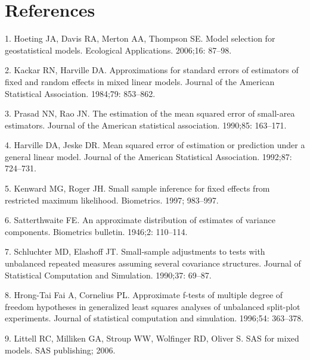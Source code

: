 \documentclass[10pt,letterpaper]{article}
\begin{document}
\hypertarget{references}{%
\section*{References}\label{references}}

\hypertarget{refs}{}
\leavevmode\hypertarget{ref-hoeting2006model}{}%
1. Hoeting JA, Davis RA, Merton AA, Thompson SE. Model selection for
geostatistical models. Ecological Applications. 2006;16: 87--98.

\leavevmode\hypertarget{ref-kackar1984approximations}{}%
2. Kackar RN, Harville DA. Approximations for standard errors of
estimators of fixed and random effects in mixed linear models. Journal
of the American Statistical Association. 1984;79: 853--862.

\leavevmode\hypertarget{ref-prasad1990estimation}{}%
3. Prasad NN, Rao JN. The estimation of the mean squared error of
small-area estimators. Journal of the American statistical association.
1990;85: 163--171.

\leavevmode\hypertarget{ref-harville1992mean}{}%
4. Harville DA, Jeske DR. Mean squared error of estimation or prediction
under a general linear model. Journal of the American Statistical
Association. 1992;87: 724--731.

\leavevmode\hypertarget{ref-kenward1997small}{}%
5. Kenward MG, Roger JH. Small sample inference for fixed effects from
restricted maximum likelihood. Biometrics. 1997; 983--997.

\leavevmode\hypertarget{ref-satterthwaite1946approximate}{}%
6. Satterthwaite FE. An approximate distribution of estimates of
variance components. Biometrics bulletin. 1946;2: 110--114.

\leavevmode\hypertarget{ref-schluchter1990small}{}%
7. Schluchter MD, Elashoff JT. Small-sample adjustments to tests with
unbalanced repeated measures assuming several covariance structures.
Journal of Statistical Computation and Simulation. 1990;37: 69--87.

\leavevmode\hypertarget{ref-hrong1996approximate}{}%
8. Hrong-Tai Fai A, Cornelius PL. Approximate f-tests of multiple degree
of freedom hypotheses in generalized least squares analyses of
unbalanced split-plot experiments. Journal of statistical computation
and simulation. 1996;54: 363--378.

\leavevmode\hypertarget{ref-littell2006sas}{}%
9. Littell RC, Milliken GA, Stroup WW, Wolfinger RD, Oliver S. SAS for
mixed models. SAS publishing; 2006.
\end{document}
